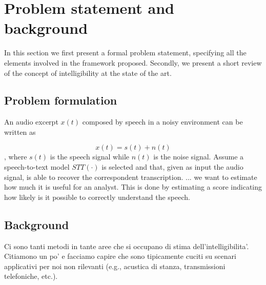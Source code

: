\section{Problem statement and background}

In this section we first present a formal problem statement, specifying all the elements involved in the framework proposed. Secondly, we present a short review of the concept of intelligibility at the state of the art.

\subsection{Problem formulation}
An audio excerpt $x(t)$ composed by speech in a noisy environment can be written as

\[ x(t) = s(t) + n(t) \],
where $s(t)$ is the speech signal while $n(t)$ is the noise signal.
Assume a speech-to-text model $STT(\cdot)$ is selected and that, given as input the audio signal, is able to recover the correspondent transcription.
 ... we want to estimate how much it is useful for an analyst.
This is done by estimating a score indicating how likely is it possible to correctly understand the speech.

\subsection{Background}
Ci sono tanti metodi in tante aree che si occupano di stima dell'intelligibilita'.
Citiamono un po' e facciamo capire che sono tipicamente cuciti su scenari applicativi per noi non rilevanti (e.g., acustica di stanza, transmissioni telefoniche, etc.).